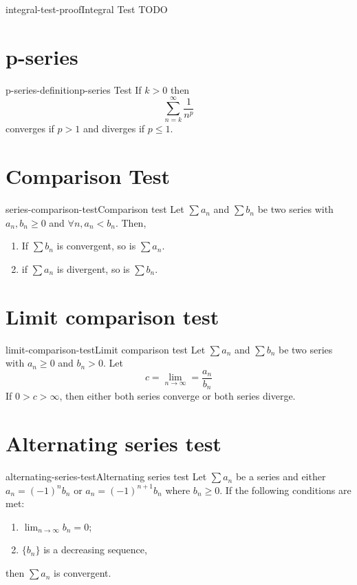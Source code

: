 \documentclass[preview]{standalone}
\begin{document}
\begin{snippetproof}{integral-test-proof}{Integral Test}{
    TODO
}
\end{snippetproof}

\section{p-series}

\begin{snippetdefinition}{p-series-definition}{p-series Test}
    If \(k > 0\) then \[\sum_{n=k}^\infty \frac{1}{n^p}\]
    converges if \(p > 1\) and diverges if \(p \leq 1\).
\end{snippetdefinition}

\section{Comparison Test}

\begin{snippettheorem}{series-comparison-test}{Comparison test}
    Let \(\sum a_n\) and \(\sum b_n\) be two series with \(a_n, b_n \geq 0\)
    and \(\forall n, a_n < b_n\). Then,
    \begin{enumerate}
        \item If \(\sum b_n\) is convergent, so is \(\sum a_n\).
        \item if \(\sum a_n\) is divergent, so is \(\sum b_n\).
    \end{enumerate}
\end{snippettheorem}

\section{Limit comparison test}

\begin{snippettheorem}{limit-comparison-test}{Limit comparison test}
    Let \(\sum a_n\) and \(\sum b_n\) be two series with \(a_n \geq 0\)
    and \(b_n > 0\). Let
    \[ c = \lim_{n \to \infty} = \frac{a_n}{b_n} \]
    If \(0 > c > \infty\), then either both series converge or both series diverge.
\end{snippettheorem}

\section{Alternating series test}

\begin{snippettheorem}{alternating-series-test}{Alternating series test}
    Let \(\sum a_n\) be a series
    and either \(a_n = {(-1)}^n b_n\) or \(a_n = {(-1)}^{n+1} b_n\)
    where \(b_n \geq 0\).
    If the following conditions are met:
    \begin{enumerate}
        \item \(\lim_{n \to \infty} b_n = 0\);
        \item \(\{b_n\}\) is a decreasing sequence,
    \end{enumerate}
    then \(\sum a_n\) is convergent.
\end{snippettheorem}
\end{document}
